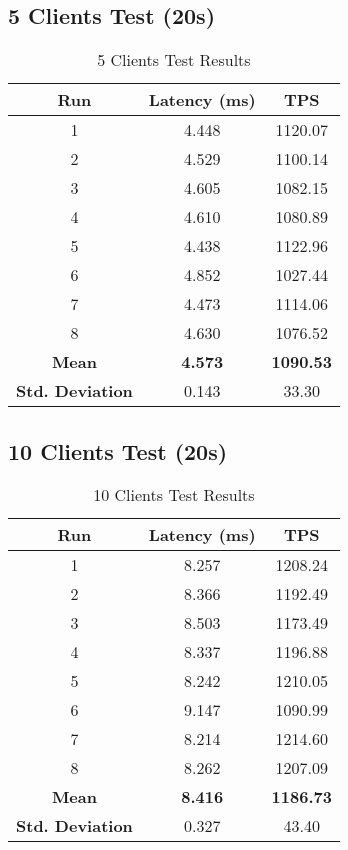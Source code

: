 \subsection{5 Clients Test (20s)}
\begin{table}[H]
\centering
\begin{tabular}{|c|c|c|}
\hline
\textbf{Run} & \textbf{Latency (ms)} & \textbf{TPS} \\
\hline
1 & 4.448 & 1120.07 \\
2 & 4.529 & 1100.14 \\
3 & 4.605 & 1082.15 \\
4 & 4.610 & 1080.89 \\
5 & 4.438 & 1122.96 \\
6 & 4.852 & 1027.44 \\
7 & 4.473 & 1114.06 \\
8 & 4.630 & 1076.52 \\
\hline
\textbf{Mean} & \textbf{4.573} & \textbf{1090.53} \\
\textbf{Std. Deviation} & 0.143 & 33.30 \\
\hline
\end{tabular}
\caption{5 Clients Test Results}
\end{table}

\subsection{10 Clients Test (20s)}
\begin{table}[H]
\centering
\begin{tabular}{|c|c|c|}
\hline
\textbf{Run} & \textbf{Latency (ms)} & \textbf{TPS} \\
\hline
1 & 8.257 & 1208.24 \\
2 & 8.366 & 1192.49 \\
3 & 8.503 & 1173.49 \\
4 & 8.337 & 1196.88 \\
5 & 8.242 & 1210.05 \\
6 & 9.147 & 1090.99 \\
7 & 8.214 & 1214.60 \\
8 & 8.262 & 1207.09 \\
\hline
\textbf{Mean} & \textbf{8.416} & \textbf{1186.73} \\
\textbf{Std. Deviation} & 0.327 & 43.40 \\
\hline
\end{tabular}
\caption{10 Clients Test Results}
\end{table}

